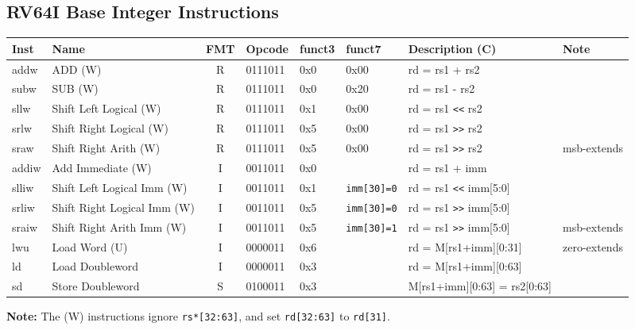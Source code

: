 \subsection*{RV64I Base Integer Instructions}
\begin{center}
\begin{tabular}
{T | l | c | T | T | T | T | l} \hline
\rm Inst & Name              & FMT & \rm Opcode & \rm funct3 & \rm funct7 & \rm Description (C) & \rm Note    \\ \hline
addw & ADD (W) & R & 0111011 & 0x0 & 0x00 & rd = rs1 + rs2 & \\
subw & SUB (W) & R & 0111011 & 0x0 & 0x20 & rd = rs1 - rs2 & \\
sllw & Shift Left Logical (W) & R & 0111011 & 0x1 & 0x00 & rd = rs1 \verb~<<~ rs2 & \\
srlw & Shift Right Logical (W) & R & 0111011 & 0x5 & 0x00 & rd = rs1 \verb~>>~ rs2 & \\
sraw & Shift Right Arith (W) & R & 0111011 & 0x5 & 0x00 & rd = rs1 \verb~>>~ rs2 & msb-extends\\
\hline
addiw & Add Immediate (W) & I & 0011011 & 0x0 &  & rd = rs1 + imm & \\
slliw & Shift Left Logical Imm (W) & I & 0011011 & 0x1 & \texttt{imm[30]=0} & rd = rs1 \verb~<<~ imm[5:0] & \\
srliw & Shift Right Logical Imm (W) & I & 0011011 & 0x5 & \texttt{imm[30]=0} & rd = rs1 \verb~>>~ imm[5:0] & \\
sraiw & Shift Right Arith Imm (W) & I & 0011011 & 0x5 & \texttt{imm[30]=1} & rd = rs1 \verb~>>~ imm[5:0] & msb-extends\\
\hline
lwu & Load Word (U) & I & 0000011 & 0x6 &  & rd = M[rs1+imm][0:31] & zero-extends\\
ld & Load Doubleword & I & 0000011 & 0x3 &  & rd = M[rs1+imm][0:63] & \\
\hline
sd & Store Doubleword & S & 0100011 & 0x3 &  & M[rs1+imm][0:63] = rs2[0:63] & \\
\end{tabular}
\end{center}
\textbf{Note:} The (W) instructions ignore \texttt{rs*[32:63]}, and set \texttt{rd[32:63]} to \texttt{rd[31]}.